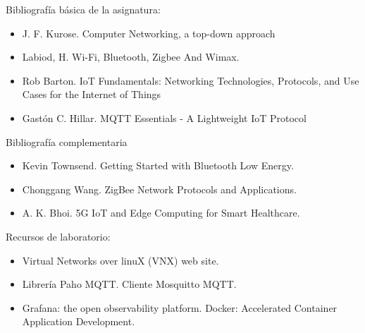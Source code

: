 \documentclass[xcolor=table,xcolor=x11names]{beamer}
\begin{document}
\begin{frame}{\subsecname}
    \small

Bibliografía básica de la asignatura:


\begin{itemize}
    
    \item J. F. Kurose. Computer Networking, a top-down approach
    \item Labiod, H. Wi-Fi, Bluetooth, Zigbee And Wimax.
    \item Rob Barton. IoT Fundamentals: Networking Technologies, Protocols, and Use Cases for the Internet of Things
    \item  Gastón C. Hillar. MQTT Essentials - A Lightweight IoT Protocol
\end{itemize}
	

Bibliografía complementaria
\begin{itemize}
    \item Kevin Townsend. Getting Started with Bluetooth Low
Energy. 
    \item Chonggang Wang. ZigBee Network Protocols and Applications.
    \item  A. K. Bhoi.
5G IoT and Edge Computing for Smart Healthcare. 
\end{itemize}

Recursos de laboratorio:

\begin{itemize}
    \item Virtual Networks over linuX (VNX) web site. 
    \item Librería Paho MQTT. Cliente Mosquitto MQTT.
    \item Grafana: the open observability platform. Docker: Accelerated Container Application Development.
\end{itemize}
\end{frame}









\end{document}
